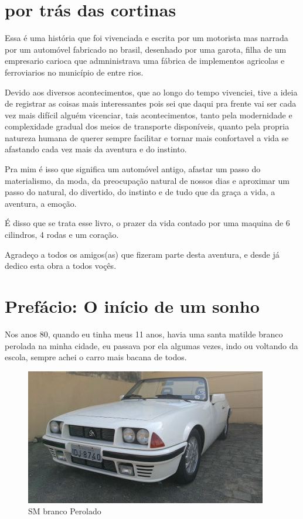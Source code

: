 \documentclass[a4paper]{report}
\begin{document}
\section{por tr\'as das cortinas}
Essa \'e uma hist\'oria que foi vivenciada e escrita por um motorista mas narrada por um autom\'ovel 
fabricado no brasil, desenhado por uma garota, filha de um empresario carioca que admninistrava  uma f\'abrica de
 implementos agricolas e ferroviarios no munic\'ipio de entre rios.

Devido aos diversos acontecimentos, que ao longo do tempo vivenciei, tive a ideia de 
registrar as coisas mais interessantes pois sei que daqui pra frente vai ser cada vez mais dif\'icil algu\'em vicenciar,
tais acontecimentos, tanto pela modernidade e complexidade gradual dos meios de transporte dispon\'iveis, quanto pela propria
natureza humana de querer sempre facilitar e tornar mais confortavel a vida se afastando cada vez mais da aventura e do instinto.

Pra mim \'e isso que significa um autom\'ovel antigo, afastar um passo do materialismo, da moda, da preocupa\c{c}\~ao natural de nossos dias
e aproximar um passo do natural, do divertido, do instinto e de tudo que da gra\c{c}a a vida, a aventura, a emo\c{c}\~ao.

\'E disso que se trata esse livro, o prazer da vida contado por uma maquina de 6 cilindros, 4 rodas e um cora\c{c}\~ao.

Agrade\c{c}o a todos os amigos(as) que fizeram parte desta aventura, e desde j\'a dedico esta obra a todos vo\c{c}\^es.

\section{Pref\'acio: O in\'icio de um sonho}
Nos anos 80, quando eu tinha meus 11 anos, havia uma santa matilde branco perolada na minha cidade,
eu passava por ela algumas vezes, indo ou voltando da escola, sempre achei o carro mais bacana de todos.

\begin{figure}[!htb]
\centering
\includegraphics{sm_bco_per}
\caption{SM branco Perolado}
\label{sm_bco}
\end{figure}
\end{document}
